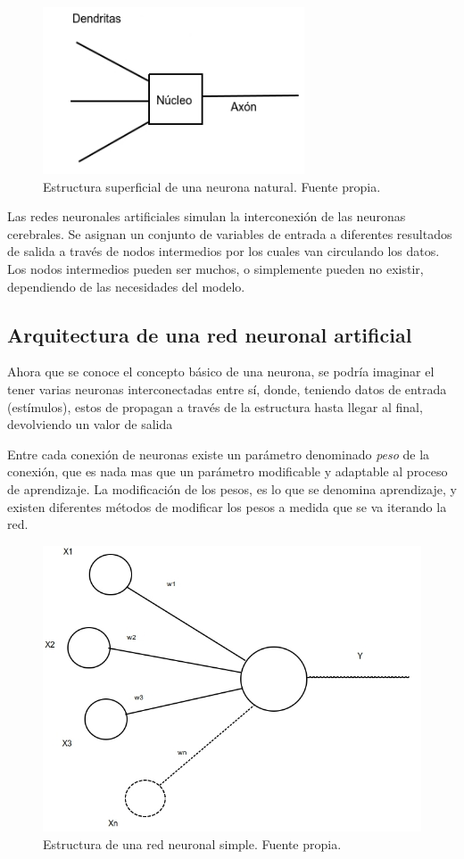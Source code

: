 \documentclass[a4paper,12pt,oneside,spanish]{book}
\begin{document}
\begin{figure}[h!]
	\includegraphics[width=220pt]{Imagenes/neurona.jpg}
	\centering
	\caption{Estructura superficial de una neurona natural. Fuente propia.}
	\label{fig:haarlike1}
\end{figure}

Las redes neuronales artificiales simulan la interconexión de las neuronas cerebrales. Se asignan un conjunto de variables de entrada a diferentes resultados de salida a través de nodos intermedios por los cuales van circulando los datos. Los nodos intermedios pueden ser muchos, o simplemente pueden no existir, dependiendo de las necesidades del modelo. \par

\subsection{Arquitectura de una red neuronal artificial}
Ahora que se conoce el concepto básico de una neurona, se podría imaginar el tener varias neuronas interconectadas entre sí, donde, teniendo datos de entrada (estímulos), estos de propagan a través de la estructura hasta llegar al final, devolviendo un valor de salida\par

Entre cada conexión de neuronas existe un parámetro denominado \textit{peso} de la conexión, que es nada mas que un parámetro modificable y adaptable al proceso de aprendizaje. La modificación de los pesos, es lo que se denomina aprendizaje, y existen diferentes métodos de modificar los pesos a medida que se va iterando la red.\par

\begin{figure}[h!]
	\includegraphics[width=340pt]{Imagenes/network1.jpg}
	\centering
	\caption{Estructura de una red neuronal simple. Fuente propia.}
	\label{fig:network1}
\end{figure}
\end{document}
